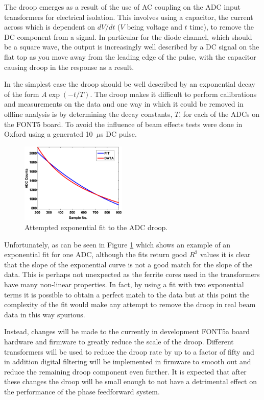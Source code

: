 The droop emerges as a result of the use of AC coupling on the ADC input transformers for electrical isolation. This involves using a capacitor, the current across which is dependent on \({dV}/{dt}\) (\(V\) being voltage and \(t\) time), to remove the DC component from a signal. In particular for the diode channel, which should be a square wave, the output is increasingly well described by a DC signal on the flat top as you move away from the leading edge of the pulse, with the capacitor causing droop in the response as a result.

In the simplest case the droop should be well described by an exponential decay of the form \(A\exp\left(-t/T\right)\). The droop makes it difficult to perform calibrations and measurements on the data and one way in which it could be removed in offline analysis is by determining the decay constants, \(T\), for each of the ADCs on the FONT5 board. To avoid the influence of beam effects tests were done in Oxford using a generated 10~\(\mu\)s DC pulse.

\begin{figure}
  \centering
  \includegraphics[width=0.45\textwidth]{Figures/droopFit}
  \caption{Attempted exponential fit to the ADC droop.}
  \label{f:droopFit}
\end{figure}

Unfortunately, as can be seen in Figure \ref{f:droopFit} which shows an example of an exponential fit for one ADC, although the fits return good \(R^{2}\) values it is clear that the slope of the exponential curve is not a good match for the slope of the data. This is perhaps not unexpected as the ferrite cores used in the transformers have many non-linear properties. In fact, by using a fit with two exponential terms it is possible to obtain a perfect match to the data but at this point the complexity of the fit would make any attempt to remove the droop in real beam data in this way spurious.

Instead, changes will be made to the currently in development FONT5a board hardware and firmware to greatly reduce the scale of the droop. Different transformers will be used to reduce the droop rate by up to a factor of fifty and in addition digital filtering will be implemented in firmware to smooth out and reduce the remaining droop component even further. It is expected that after these changes the droop will be small enough to not have a detrimental effect on the performance of the phase feedforward system. 

